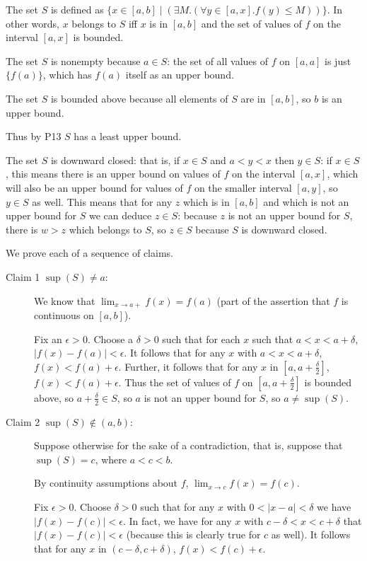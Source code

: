 \documentclass[12pt]{article}
\begin{document}
\begin{description}
The set $S$ is defined as $\{x \in [a,b] \mid (\exists M.(\forall y \in [a,x].f(y) \leq M))\}$.  In other words, $x$ belongs to $S$ iff
$x$ is in $[a,b]$ and the set of values of $f$ on the interval $[a,x]$ is bounded.

The set $S$ is nonempty because $a \in S$:  the set of all values of $f$ on $[a,a]$ is just $\{f(a)\}$, which has $f(a)$ itself as an upper bound.

The set $S$ is bounded above because all elements of $S$ are in $[a,b]$, so $b$ is an upper bound.

Thus by P13 $S$ has a least upper bound.

The set $S$ is downward closed:  that is, if $x\in S$ and $a<y<x$ then $y \in S$:  if $x \in S$, this means there is an upper bound on values of $f$ on the interval $[a,x]$, which will also be an upper bound for values of $f$ on the smaller interval $[a,y]$, so $y \in S$ as well.  This
means that for any $z$ which is in $[a,b]$ and which is not an upper bound for $S$ we can deduce $z \in S$:  because $z$ is not an upper bound for $S$, there is $w>z$ which belongs to $S$, so $z \in S$ because $S$ is downward closed.

We prove each of a sequence of claims.

\begin{description}

\item[Claim 1  $\sup(S) \neq a$:]  
We know that $\lim_{x \rightarrow a+}f(x)=f(a)$ (part of the assertion that $f$ is continuous on $[a,b]$).

Fix an $\epsilon>0$.  Choose a $\delta>0$ such that for each $x$ such that $a < x <a+\delta$, $|f(x)-f(a)|<\epsilon$.
It follows that for any $x$ with $a<x<a+\delta$, $f(x)<f(a)+\epsilon$.  Further, it follows that for any $x$ in $[a,a+\frac{\delta}2]$,
$f(x)<f(a)+\epsilon$.  Thus the set of values of $f$ on $[a,a+\frac{\delta}2]$ is bounded above, so $a+\frac{\delta}2\in S$,
so $a$ is not an upper bound for $S$, so $a \neq \sup(S)$.

\item[Claim 2 $\sup(S) \not\in (a,b)$:]
Suppose otherwise for the sake of a contradiction, that is, suppose that $\sup(S)=c$, where $a<c<b$.

By continuity assumptions about $f$, $\lim_{x \rightarrow c}f(x)=f(c)$.

Fix $\epsilon>0$.  Choose $\delta>0$ such that for any $x$ with $0<|x-a|<\delta$ we have $|f(x)-f(c)|<\epsilon$.
In fact, we have for any $x$ with $c-\delta<x<c+\delta$ that $|f(x)-f(c)|<\epsilon$ (because this is clearly true for $c$ as well).
It follows that for any $x$ in $(c-\delta,c+\delta)$, $f(x)<f(c)+\epsilon$.


\end{description}
\end{description}
\end{document}
